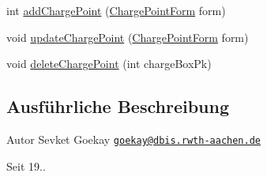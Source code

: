 \begin{DoxyCompactItemize}
\item 
int \hyperlink{interfacede_1_1rwth_1_1idsg_1_1steve_1_1repository_1_1_charge_point_repository_af4996560e9292ae2b55caaca98f24f26}{add\+Charge\+Point} (\hyperlink{classde_1_1rwth_1_1idsg_1_1steve_1_1web_1_1dto_1_1_charge_point_form}{Charge\+Point\+Form} form)
\item 
void \hyperlink{interfacede_1_1rwth_1_1idsg_1_1steve_1_1repository_1_1_charge_point_repository_ac5717da58e380cb71b6f9da787c14c6d}{update\+Charge\+Point} (\hyperlink{classde_1_1rwth_1_1idsg_1_1steve_1_1web_1_1dto_1_1_charge_point_form}{Charge\+Point\+Form} form)
\item 
void \hyperlink{interfacede_1_1rwth_1_1idsg_1_1steve_1_1repository_1_1_charge_point_repository_a54b07eb5e931393a639349cfa5302add}{delete\+Charge\+Point} (int charge\+Box\+Pk)
\end{DoxyCompactItemize}


\subsection{Ausführliche Beschreibung}
\begin{DoxyAuthor}{Autor}
Sevket Goekay \href{mailto:goekay@dbis.rwth-aachen.de}{\tt goekay@dbis.\+rwth-\/aachen.\+de} 
\end{DoxyAuthor}
\begin{DoxySince}{Seit}
19.. 
\end{DoxySince}


